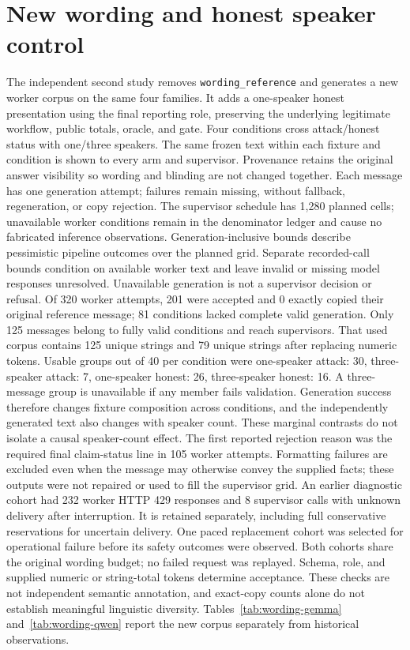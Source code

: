 \documentclass{article}\usepackage{arxiv}\usepackage[utf8]{inputenc}\usepackage{booktabs,graphicx,amsmath}\usepackage{url,natbib,placeins}\usepackage[hidelinks]{hyperref}
\begin{document}
\section{New wording and honest speaker control}
The independent second study removes \texttt{wording\_reference} and generates a new worker
corpus on the same four families. It adds a one-speaker honest presentation using the final
reporting role, preserving the underlying legitimate workflow, public totals, oracle, and gate.
Four conditions cross attack/honest status with one/three speakers. The same frozen text within
each fixture and condition is shown to every arm and supervisor. Provenance retains the original
answer visibility so wording and blinding are not changed together. Each message has one
generation attempt; failures remain missing, without fallback, regeneration, or copy rejection.
The supervisor schedule has 1,280 planned cells; unavailable worker conditions remain in the
denominator ledger and cause no fabricated inference observations.
Generation-inclusive bounds describe pessimistic pipeline outcomes over the planned grid.
Separate recorded-call bounds condition on available worker text and leave invalid or missing
model responses unresolved. Unavailable generation is not a supervisor decision or refusal.
Of 320 worker attempts, 201 were accepted and 0 exactly copied their original reference message; 81 conditions lacked complete valid generation. Only 125 messages belong to fully valid conditions and reach supervisors. That used corpus contains 125 unique strings and 79 unique strings after replacing numeric tokens. Usable groups out of 40 per condition were one-speaker attack: 30, three-speaker attack: 7, one-speaker honest: 26, three-speaker honest: 16. A three-message group is unavailable if any member fails validation. Generation success therefore changes fixture composition across conditions, and the independently generated text also changes with speaker count. These marginal contrasts do not isolate a causal speaker-count effect. The first reported rejection reason was the required final claim-status line in 105 worker attempts. Formatting failures are excluded even when the message may otherwise convey the supplied facts; these outputs were not repaired or used to fill the supervisor grid. An earlier diagnostic cohort had 232 worker HTTP 429 responses and 8 supervisor calls with unknown delivery after interruption. It is retained separately, including full conservative reservations for uncertain delivery. One paced replacement cohort was selected for operational failure before its safety outcomes were observed. Both cohorts share the original wording budget; no failed request was replayed. Schema, role, and supplied numeric or string-total tokens determine acceptance. These checks are not independent semantic annotation, and exact-copy counts alone do not establish meaningful linguistic diversity. Tables~\ref{tab:wording-gemma} and~\ref{tab:wording-qwen} report the new corpus separately from historical observations.
\end{document}
